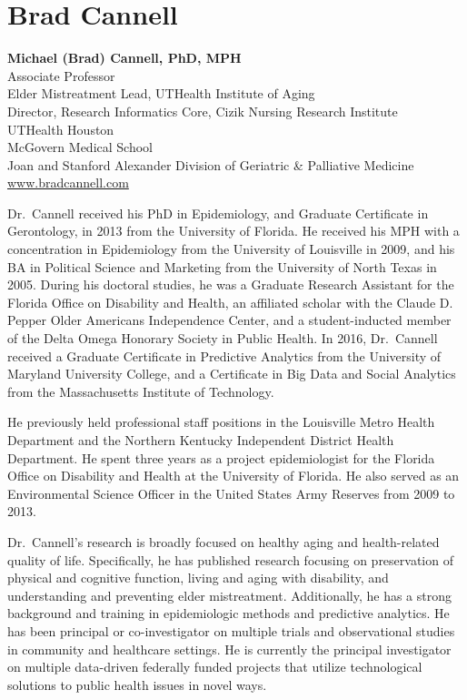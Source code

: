 \documentclass[
  letterpaper,
  DIV=11,
  numbers=noendperiod]{scrreprt}
\begin{document}

\section*{Brad Cannell}\label{brad-cannell}


\textbf{Michael (Brad) Cannell, PhD, MPH}\\
Associate Professor\\
Elder Mistreatment Lead, UTHealth Institute of Aging\\
Director, Research Informatics Core, Cizik Nursing Research Institute\\
UTHealth Houston\\
McGovern Medical School\\
Joan and Stanford Alexander Division of Geriatric \& Palliative
Medicine\\
\href{https://www.bradcannell.com}{www.bradcannell.com}

Dr.~Cannell received his PhD in Epidemiology, and Graduate Certificate
in Gerontology, in 2013 from the University of Florida. He received his
MPH with a concentration in Epidemiology from the University of
Louisville in 2009, and his BA in Political Science and Marketing from
the University of North Texas in 2005. During his doctoral studies, he
was a Graduate Research Assistant for the Florida Office on Disability
and Health, an affiliated scholar with the Claude D. Pepper Older
Americans Independence Center, and a student-inducted member of the
Delta Omega Honorary Society in Public Health. In 2016, Dr.~Cannell
received a Graduate Certificate in Predictive Analytics from the
University of Maryland University College, and a Certificate in Big Data
and Social Analytics from the Massachusetts Institute of Technology.

He previously held professional staff positions in the Louisville Metro
Health Department and the Northern Kentucky Independent District Health
Department. He spent three years as a project epidemiologist for the
Florida Office on Disability and Health at the University of Florida. He
also served as an Environmental Science Officer in the United States
Army Reserves from 2009 to 2013.

Dr.~Cannell's research is broadly focused on healthy aging and
health-related quality of life. Specifically, he has published research
focusing on preservation of physical and cognitive function, living and
aging with disability, and understanding and preventing elder
mistreatment. Additionally, he has a strong background and training in
epidemiologic methods and predictive analytics. He has been principal or
co-investigator on multiple trials and observational studies in
community and healthcare settings. He is currently the principal
investigator on multiple data-driven federally funded projects that
utilize technological solutions to public health issues in novel ways.
\end{document}
